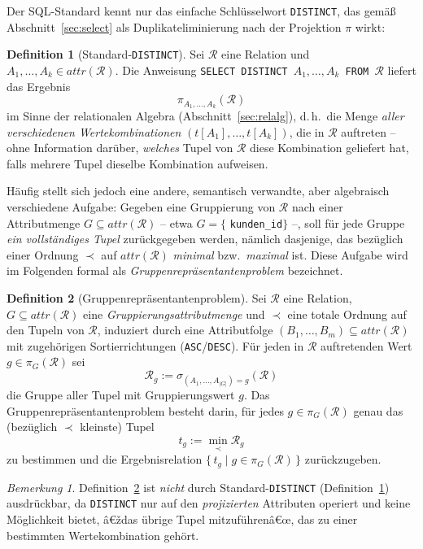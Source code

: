 ﻿\documentclass[a4paper,12pt]{report}
\theoremstyle{definition}
\newtheorem{definition}{Definition}[chapter]
\theoremstyle{remark}
\newtheorem{remark}{Bemerkung}[chapter]
\newcommand{\R}{\mathcal{R}}
\newcommand{\att}{\mathit{attr}}
\begin{document}
Der SQL-Standard kennt nur das einfache Schlüsselwort
\texttt{DISTINCT}, das gemäß Abschnitt~\ref{sec:select} als
Duplikateliminierung nach der Projektion $\pi$ wirkt:

\begin{definition}[Standard-\texttt{DISTINCT}]
\label{def:distinct-standard}
Sei $\R$ eine Relation und $A_1,\ldots,A_k\in\att(\R)$. Die Anweisung
\texttt{SELECT DISTINCT $A_1,\ldots,A_k$ FROM $\R$} liefert das
Ergebnis
\[
  \pi_{A_1,\ldots,A_k}(\R)
\]
im Sinne der relationalen Algebra (Abschnitt~\ref{sec:relalg}), d.\,h.\
die Menge \emph{aller verschiedenen Wertekombinationen}
$(t[A_1],\ldots,t[A_k])$, die in $\R$ auftreten -- ohne Information
darüber, \emph{welches} Tupel von $\R$ diese Kombination geliefert
hat, falls mehrere Tupel dieselbe Kombination aufweisen.
\end{definition}

Häufig stellt sich jedoch eine andere, semantisch verwandte, aber
algebraisch verschiedene Aufgabe: Gegeben eine Gruppierung von $\R$
nach einer Attributmenge $G\subseteq\att(\R)$ -- etwa $G=\{$
\texttt{kunden\_id}$\}$ --, soll für jede Gruppe \emph{ein vollständiges
Tupel} zurückgegeben werden, nämlich dasjenige, das bezüglich einer
Ordnung $\prec$ auf $\att(\R)$ \emph{minimal} bzw.\ \emph{maximal}
ist. Diese Aufgabe wird im Folgenden formal als
\emph{Gruppenrepräsentantenproblem} bezeichnet.

\begin{definition}[Gruppenrepräsentantenproblem]
\label{def:gruppenrepraesentant}
Sei $\R$ eine Relation, $G\subseteq\att(\R)$ eine
\emph{Gruppierungsattributmenge} und $\prec$ eine totale
Ordnung auf den Tupeln von $\R$, induziert durch eine
Attributfolge $(B_1,\ldots,B_m)\subseteq\att(\R)$ mit zugehörigen
Sortierrichtungen (\texttt{ASC}/\texttt{DESC}). Für jeden in $\R$
auftretenden Wert $g\in\pi_G(\R)$ sei
\[
  \R_g := \sigma_{(A_1,\ldots,A_{|G|})=g}(\R)
\]
die Gruppe aller Tupel mit Gruppierungswert $g$. Das
Gruppenrepräsentantenproblem besteht darin, für jedes $g\in\pi_G(\R)$
genau das (bezüglich $\prec$ kleinste) Tupel
\[
  t_g := \min_{\prec} \R_g
\]
zu bestimmen und die Ergebnisrelation
$\{\,t_g \mid g\in\pi_G(\R)\,\}$ zurückzugeben.
\end{definition}

\begin{remark}
Definition~\ref{def:gruppenrepraesentant} ist \emph{nicht} durch
Standard-\texttt{DISTINCT} (Definition~\ref{def:distinct-standard})
ausdrückbar, da \texttt{DISTINCT} nur auf den
\emph{projizierten} Attributen operiert und keine Möglichkeit bietet,
â€ždas übrige Tupel mitzuführenâ€œ, das zu einer bestimmten
Wertekombination gehört.
\end{remark}
\end{document}
